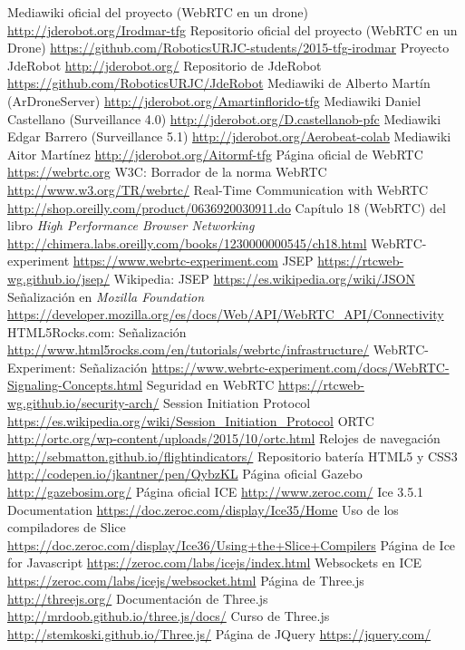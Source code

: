 \documentclass[oneside,a4paper,12pt]{book}
\begin{document}
\begin{thebibliography}{}

 Mediawiki oficial del proyecto (WebRTC en un drone) \url{http://jderobot.org/Irodmar-tfg}
 Repositorio oficial del proyecto (WebRTC en un Drone) \url{https://github.com/RoboticsURJC-students/2015-tfg-irodmar} 
 Proyecto JdeRobot \url{http://jderobot.org/} 
 Repositorio de JdeRobot \url{https://github.com/RoboticsURJC/JdeRobot} 
 Mediawiki de Alberto Martín (ArDroneServer) \url{http://jderobot.org/Amartinflorido-tfg}
 Mediawiki Daniel Castellano (Surveillance 4.0) \url{http://jderobot.org/D.castellanob-pfc} 
 Mediawiki Edgar Barrero (Surveillance 5.1) \url{http://jderobot.org/Aerobeat-colab}
 Mediawiki Aitor Martínez \url{http://jderobot.org/Aitormf-tfg}
 Página oficial de WebRTC \url{https://webrtc.org}
 W3C: Borrador de la norma WebRTC \url{http://www.w3.org/TR/webrtc/}
 Real-Time Communication with WebRTC \url{http://shop.oreilly.com/product/0636920030911.do}
 Capítulo 18 (WebRTC) del libro \emph{High Performance Browser Networking} \url{http://chimera.labs.oreilly.com/books/1230000000545/ch18.html}
 WebRTC-experiment \url{https://www.webrtc-experiment.com}
 JSEP  \url{https://rtcweb-wg.github.io/jsep/}
 Wikipedia: JSEP  \url{https://es.wikipedia.org/wiki/JSON}
 Señalización en \emph{Mozilla Foundation} \url{https://developer.mozilla.org/es/docs/Web/API/WebRTC_API/Connectivity}
 HTML5Rocks.com: Señalización \url{http://www.html5rocks.com/en/tutorials/webrtc/infrastructure/}
 WebRTC-Experiment: Señalización \url{https://www.webrtc-experiment.com/docs/WebRTC-Signaling-Concepts.html}
 Seguridad en WebRTC \url{https://rtcweb-wg.github.io/security-arch/}
 Session Initiation Protocol \url{https://es.wikipedia.org/wiki/Session_Initiation_Protocol}
 ORTC \url{http://ortc.org/wp-content/uploads/2015/10/ortc.html}
 Relojes de navegación \url{http://sebmatton.github.io/flightindicators/}
 Repositorio batería HTML5 y CSS3 \url{http://codepen.io/jkantner/pen/QybzKL}
 Página oficial Gazebo \url{http://gazebosim.org/}
 Página oficial ICE  \url{http://www.zeroc.com/}
Ice 3.5.1 Documentation  \url{https://doc.zeroc.com/display/Ice35/Home}
 Uso de los compiladores de Slice \url{https://doc.zeroc.com/display/Ice36/Using+the+Slice+Compilers}
 Página de Ice for Javascript  \url{https://zeroc.com/labs/icejs/index.html}
 Websockets en ICE \url{https://zeroc.com/labs/icejs/websocket.html}
 Página de Three.js \url{http://threejs.org/}
 Documentación de Three.js \url{http://mrdoob.github.io/three.js/docs/}
 Curso de Three.js \url{http://stemkoski.github.io/Three.js/}
 Página de JQuery \url{https://jquery.com/}

\end{thebibliography} 
\end{document}
